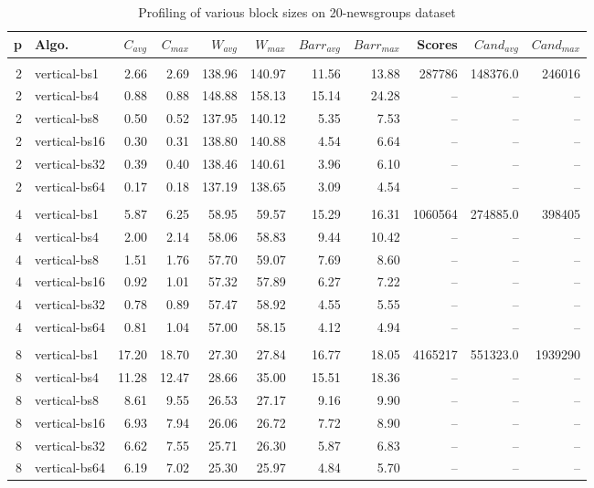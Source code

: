 \begin{table*}
\centering
\caption{Profiling of various block sizes on 20-newsgroups dataset}
 \begin{tabular}{r l r r r r r r r r r}
p & Algo. & $C_{avg}$ & $C_{max}$ & $W_{avg}$ & $W_{max}$ & $Barr_{avg}$ & $Barr_{max}$ & Scores & $Cand_{avg}$ & $Cand_{max}$ \\
\hline 
\hline \\
2 &vertical-bs1 &2.66 & 2.69 & 138.96 & 140.97 & 11.56 & 13.88 & 287786 & 148376.0 & 246016\\
2 &vertical-bs4 &0.88 & 0.88 & 148.88 & 158.13 & 15.14 & 24.28 & -- & -- & --\\
2 &vertical-bs8 &0.50 & 0.52 & 137.95 & 140.12 & 5.35 & 7.53 & -- & --& --\\
2 &vertical-bs16 &0.30 & 0.31 & 138.80 & 140.88 & 4.54 & 6.64 & -- & -- & --\\
2 &vertical-bs32 &0.39 & 0.40 & 138.46 & 140.61 & 3.96 & 6.10 & -- & -- & --\\
2 &vertical-bs64 &0.17 & 0.18 & 137.19 & 138.65 & 3.09 & 4.54 & -- & -- & --\\
 
\hline \\
4 &vertical-bs1 &5.87 & 6.25 & 58.95 & 59.57 & 15.29 & 16.31 & 1060564 & 274885.0 & 398405\\
4 &vertical-bs4 &2.00 & 2.14 & 58.06 & 58.83 & 9.44 & 10.42 & -- & -- & --\\
4 &vertical-bs8 &1.51 & 1.76 & 57.70 & 59.07 & 7.69 & 8.60 & -- & -- & --\\
4 &vertical-bs16 &0.92 & 1.01 & 57.32 & 57.89 & 6.27 & 7.22 & -- & -- & --\\
4 &vertical-bs32 &0.78 & 0.89 & 57.47 & 58.92 & 4.55 & 5.55 & -- & -- & --\\
4 &vertical-bs64 &0.81 & 1.04 & 57.00 & 58.15 & 4.12 & 4.94 & -- & -- &--\\
 
\hline \\
8 &vertical-bs1 &17.20 & 18.70 & 27.30 & 27.84 & 16.77 & 18.05 & 4165217 & 551323.0 & 1939290\\
8 &vertical-bs4 &11.28 & 12.47 & 28.66 & 35.00 & 15.51 & 18.36 & -- & -- & --\\
8 &vertical-bs8 &8.61 & 9.55 & 26.53 & 27.17 & 9.16 & 9.90 & -- &-- & --\\
8 &vertical-bs16 &6.93 & 7.94 & 26.06 & 26.72 & 7.72 & 8.90 & -- & -- & --\\
8 &vertical-bs32 &6.62 & 7.55 & 25.71 & 26.30 & 5.87 & 6.83 & -- & --& --\\
8 &vertical-bs64 &6.19 & 7.02 & 25.30 & 25.97 & 4.84 & 5.70 & -- & -- & --\\
 

\end{tabular}
\end{table*}
